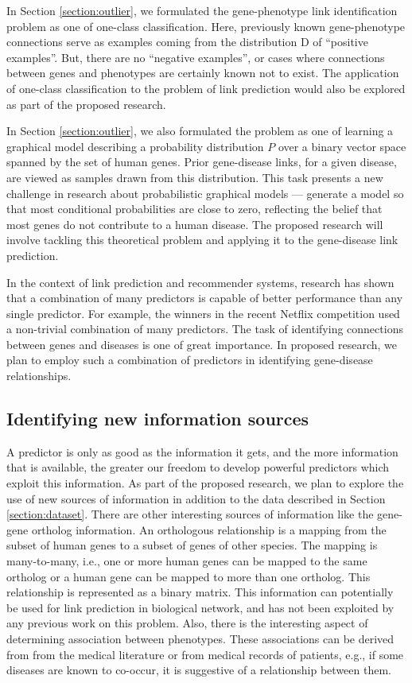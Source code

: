 In Section \ref{section:outlier}, we formulated the gene-phenotype link identification problem as one of one-class classification. Here, previously known gene-phenotype connections serve as examples coming from the distribution D of ``positive examples''. But, there are no ``negative examples'', or cases where connections between genes and phenotypes are certainly known not to exist. The application of one-class classification to the problem of link prediction would also be explored as part of the proposed research.

In Section \ref{section:outlier}, we also formulated the problem as one of learning a graphical model describing a probability distribution $P$ over a binary vector space spanned by the set of human genes. Prior gene-disease links, for a given disease, are viewed as samples drawn from this distribution. This task presents a new challenge in research about probabilistic graphical models --- generate a model so that most conditional probabilities are close to zero, reflecting the belief that most genes do not contribute to a human disease. The proposed research will involve tackling this theoretical problem and applying it to the gene-disease link prediction.

In the context of link prediction and recommender systems, research has shown that a combination of many predictors is capable of better performance than any single predictor. For example, the winners in the recent Netflix competition used a non-trivial combination of many predictors. The task of identifying connections between genes and diseases is one of great importance. In proposed research, we plan to employ such a combination of predictors in identifying gene-disease relationships.

\subsection{Identifying new information sources}
A predictor is only as good as the information it gets, and the more information that is available, the greater our freedom to develop powerful predictors which exploit this information. As part of the proposed research, we plan to explore the use of new sources of information in addition to the data described in Section \ref{section:dataset}. There are other interesting sources of information like the gene-gene ortholog information. An orthologous relationship is a mapping from the subset of human genes to a subset of genes of other species. The mapping is many-to-many, i.e., one or more human genes can be mapped to the same ortholog or a human gene can be mapped to more than one ortholog. This relationship is represented as a binary matrix. This information can potentially be used for link prediction in biological network, and has not been exploited by any previous work on this problem. Also, there is the interesting aspect of determining association between phenotypes. These associations can be derived from from the medical literature or from medical records of patients, e.g., if some diseases are known to co-occur, it is suggestive of a relationship between them.


